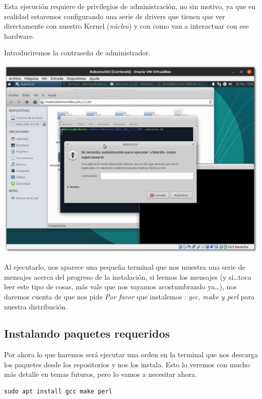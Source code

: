 \documentclass[11pt]{article}
\begin{document}
Esta ejecución requiere de privilegios de administración, no sin motivo,
ya que en realidad estaremos configurando una serie de drivers que
tienen que ver directamente con nuestro Kernel (\emph{núcleo}) y con como van
a interactuar con ese hardware.

Introduciremos la contraseña de administrador.

\begin{center}
\includegraphics[width=.9\linewidth]{imgs/VBox_GuestAdd_LinuX_018.png}
\end{center}

Al ejecutarlo, nos aparece una pequeña terminal que nos muestra una
serie de mensajes acerca del progreso de la instalación, si leemos los
mensajes (y sí\ldots{}toca leer este tipo de cosas, más vale que nos vayamos
acostumbrando ya\ldots{}), nos daremos cuenta de que nos pide \emph{Por favor} que
instalemos : \emph{gcc, make y perl} para nuestra distribución.

\subsection{Instalando paquetes requeridos}
\label{sec:org260d463}
Por ahora lo que haremos será ejecutar una orden en la terminal que nos
descarga los paquetes desde los repositorios y nos los instala. Esto lo
veremos con mucho más detalle en temas futuros, pero lo vamos a
necesitar ahora.

\begin{verbatim}
sudo apt install gcc make perl
\end{verbatim}
\end{document}
